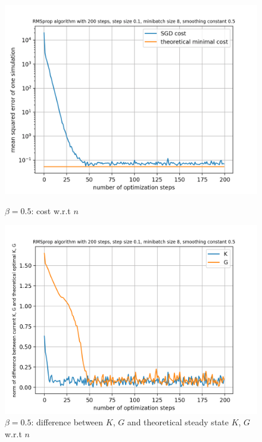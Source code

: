 \documentclass{article}
\begin{document}
\begin{figure}[h!]
	\centering
	\begin{minipage}[t]{.28\paperwidth}
		\centering
		\includegraphics[width=1.0\textwidth]{Figures/beta_0_5.png}
		\caption{$\beta = 0.5$: cost w.r.t $n$}
	\end{minipage}%
	\begin{minipage}[t]{.28\paperwidth}
		\centering
		\includegraphics[width=1.0\textwidth]{Figures/d_beta_0_5.png}
		\caption{$\beta = 0.5$: difference between $K$, $G$ and theoretical steady state $K$, $G$ w.r.t $n$}
	\end{minipage}%
	\begin{minipage}[t]{.28\paperwidth}
		\centering

\end{minipage}
\end{figure}
\end{document}
